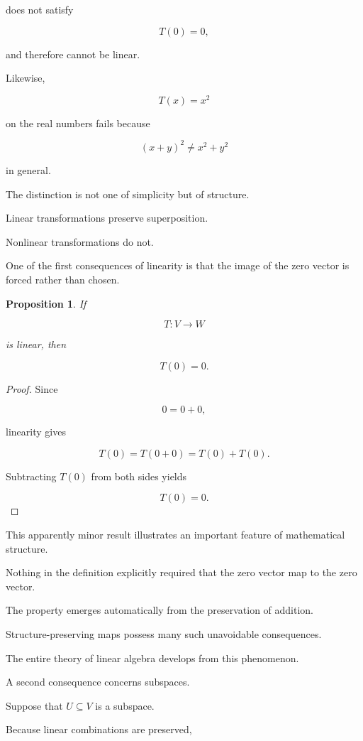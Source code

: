 \documentclass[11pt]{book}
\numberwithin{equation}{chapter}
\theoremstyle{definition}
\theoremstyle{plain}
\newtheorem{proposition}[definition]{Proposition}
\theoremstyle{remark}
\begin{document}
does not satisfy

\[
T(0)=0,
\]

and therefore cannot be linear.

Likewise,

\[
T(x)=x^{2}
\]

on the real numbers fails because

\[
(x+y)^2
\neq
x^2+y^2
\]

in general.

The distinction is not one of simplicity but of structure.

Linear transformations preserve superposition.

Nonlinear transformations do not.

One of the first consequences of linearity is that the image of the zero vector is forced rather than chosen.

\begin{proposition}
If

\[
T:V\rightarrow W
\]

is linear, then

\[
T(0)=0.
\]
\end{proposition}

\begin{proof}

Since

\[
0=0+0,
\]

linearity gives

\[
T(0)
=
T(0+0)
=
T(0)+T(0).
\]

Subtracting \(T(0)\) from both sides yields

\[
T(0)=0.
\]

\end{proof}

This apparently minor result illustrates an important feature of mathematical structure.

Nothing in the definition explicitly required that the zero vector map to the zero vector.

The property emerges automatically from the preservation of addition.

Structure-preserving maps possess many such unavoidable consequences.

The entire theory of linear algebra develops from this phenomenon.

A second consequence concerns subspaces.

Suppose that \(U\subseteq V\) is a subspace.

Because linear combinations are preserved,
\end{document}
